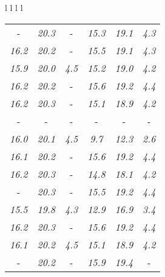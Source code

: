 \documentclass[sigplan,screen]{acmart}
\makeatletter
\newcommand{\ccell}[3][]{%
  \kern-\fboxsep
  \if\relax\detokenize{#1}\relax
    \expandafter\@firstoftwo
  \else
    \expandafter\@secondoftwo
  \fi
  {\colorbox{#2}}%
  {\colorbox[#1]{#2}}%
  {#3}\kern-\fboxsep
}
\makeatother
\begin{document}
\begin{table*}
\begin{tabular}{l l l l}
\begin{tabular}{c c c c c c}
      \rule{0pt}{4ex}    
      
      
       \ccell[gray]{0.9}{\textit{16.3}} & \textit{20.3} &  \ccell[gray]{0.9}{\textit{4.6}} & \textit{15.3} & \textit{19.1} & \textit{4.3} \\
      \textit{16.2} & \textit{20.2} &  \ccell[gray]{0.9}{\textit{4.6}} & \textit{15.5} & \textit{19.1} & \textit{4.3} \\
      \textit{15.9} & \textit{20.0} & \textit{4.5} & \textit{15.2} & \textit{19.0} & \textit{4.2} \\
      \textit{16.2} & \textit{20.2} &  \ccell[gray]{0.9}{\textit{4.6}} & \textit{15.6} & \textit{19.2} & \textit{4.4} \\
      \textit{16.2} & \textit{20.3} &  \ccell[gray]{0.9}{\textit{4.6}} & \textit{15.1} & \textit{18.9} & \textit{4.2} \\
       \ccell[gray]{0.9}{\textit{16.3}} &  \ccell[gray]{0.9}{\textit{20.4}} &  \ccell[gray]{0.9}{\textit{4.6}} &  \ccell[gray]{0.9}{\textit{16.0}} &  \ccell[gray]{0.9}{\textit{20.0}} &  \ccell[gray]{0.9}{\textit{4.5}} \\
      \textit{16.0} & \textit{20.1} & \textit{4.5} & \textit{9.7} & \textit{12.3} & \textit{2.6} \\
      \textit{16.1} & \textit{20.2} &  \ccell[gray]{0.9}{\textit{4.6}} & \textit{15.6} & \textit{19.2} & \textit{4.4} \\
      \textit{16.2} & \textit{20.3} &  \ccell[gray]{0.9}{\textit{4.6}} & \textit{14.8} & \textit{18.1} & \textit{4.2} \\
       \ccell[gray]{0.9}{\textit{16.3}} & \textit{20.3} &  \ccell[gray]{0.9}{\textit{4.6}} & \textit{15.5} & \textit{19.2} & \textit{4.4} \\
      \textit{15.5} & \textit{19.8} & \textit{4.3} & \textit{12.9} & \textit{16.9} & \textit{3.4} \\
      \textit{16.2} & \textit{20.3} &  \ccell[gray]{0.9}{\textit{4.6}} & \textit{15.6} & \textit{19.2} & \textit{4.4} \\
      \textit{16.1} & \textit{20.2} & \textit{4.5} & \textit{15.1} & \textit{18.9} & \textit{4.2} \\
       \ccell[gray]{0.9}{\textit{16.3}} & \textit{20.2} &  \ccell[gray]{0.9}{\textit{4.6}} & \textit{15.9} & \textit{19.4} &  \ccell[gray]{0.9}{\textit{4.5}} \\
\end{tabular}
\\




    \end{tabular}
    
\bigskip

\end{table*}
    
\end{document}
